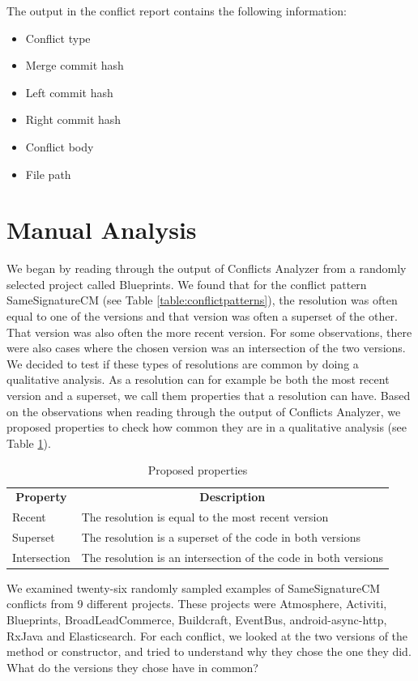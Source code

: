 The output in the conflict report contains the following information:
\begin{itemize}
\item Conflict type
\item Merge commit hash
\item Left commit hash
\item Right commit hash
\item Conflict body
\item File path
\end{itemize}

\section{Manual Analysis}\label{sec:manual}
\FloatBarrier
We began by reading through the output of Conflicts Analyzer from a randomly selected project called Blueprints. We found that for the conflict pattern SameSignatureCM (see Table \ref{table:conflictpatterns}), the resolution was often equal to one of the versions and that version was often a superset of the other. That version was also often the more recent version. For some observations, there were also cases where the chosen version was an intersection of the two versions. We decided to test if these types of resolutions are common by doing a qualitative analysis. As a resolution can for example be both the most recent version and a superset, we call them properties that a resolution can have. Based on the observations when reading through the output of Conflicts Analyzer, we proposed properties to check how common they are in a qualitative analysis (see Table \ref{table:pproperties}).
\begin{table}
\caption{Proposed properties}\label{table:pproperties}
\begin{tabular}{ p{7cm} p{7cm} }
\hline
\multicolumn{1}{c}{\textbf{Property}} & \multicolumn{1}{c}{\textbf{Description}}\\
Recent & The resolution is equal to the most recent version\\
Superset & The resolution is a superset of the code in both versions\\
Intersection & The resolution is an intersection of the code in both versions\\
\end{tabular}
\end{table}
\FloatBarrier

We examined twenty-six randomly sampled examples of SameSignatureCM conflicts from 9 different projects. These projects were Atmosphere, Activiti, Blueprints, BroadLeadCommerce, Buildcraft, EventBus, android-async-http, RxJava and Elasticsearch. For each conflict, we looked at the two versions of the method or constructor, and tried to understand why they chose the one they did. What do the versions they chose have in common?

